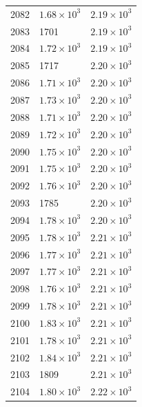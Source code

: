 \begin{table}[H]
\begin{tabular}{lll}
2082 & $\displaystyle 1.68 \times 10^{3}$ & $\displaystyle 2.19 \times 10^{3}$ \\
2083 & 1701 & $\displaystyle 2.19 \times 10^{3}$ \\
2084 & $\displaystyle 1.72 \times 10^{3}$ & $\displaystyle 2.19 \times 10^{3}$ \\
2085 & 1717 & $\displaystyle 2.20 \times 10^{3}$ \\
2086 & $\displaystyle 1.71 \times 10^{3}$ & $\displaystyle 2.20 \times 10^{3}$ \\
2087 & $\displaystyle 1.73 \times 10^{3}$ & $\displaystyle 2.20 \times 10^{3}$ \\
2088 & $\displaystyle 1.71 \times 10^{3}$ & $\displaystyle 2.20 \times 10^{3}$ \\
2089 & $\displaystyle 1.72 \times 10^{3}$ & $\displaystyle 2.20 \times 10^{3}$ \\
2090 & $\displaystyle 1.75 \times 10^{3}$ & $\displaystyle 2.20 \times 10^{3}$ \\
2091 & $\displaystyle 1.75 \times 10^{3}$ & $\displaystyle 2.20 \times 10^{3}$ \\
2092 & $\displaystyle 1.76 \times 10^{3}$ & $\displaystyle 2.20 \times 10^{3}$ \\
2093 & 1785 & $\displaystyle 2.20 \times 10^{3}$ \\
2094 & $\displaystyle 1.78 \times 10^{3}$ & $\displaystyle 2.20 \times 10^{3}$ \\
2095 & $\displaystyle 1.78 \times 10^{3}$ & $\displaystyle 2.21 \times 10^{3}$ \\
2096 & $\displaystyle 1.77 \times 10^{3}$ & $\displaystyle 2.21 \times 10^{3}$ \\
2097 & $\displaystyle 1.77 \times 10^{3}$ & $\displaystyle 2.21 \times 10^{3}$ \\
2098 & $\displaystyle 1.76 \times 10^{3}$ & $\displaystyle 2.21 \times 10^{3}$ \\
2099 & $\displaystyle 1.78 \times 10^{3}$ & $\displaystyle 2.21 \times 10^{3}$ \\
2100 & $\displaystyle 1.83 \times 10^{3}$ & $\displaystyle 2.21 \times 10^{3}$ \\
2101 & $\displaystyle 1.78 \times 10^{3}$ & $\displaystyle 2.21 \times 10^{3}$ \\
2102 & $\displaystyle 1.84 \times 10^{3}$ & $\displaystyle 2.21 \times 10^{3}$ \\
2103 & 1809 & $\displaystyle 2.21 \times 10^{3}$ \\
2104 & $\displaystyle 1.80 \times 10^{3}$ & $\displaystyle 2.22 \times 10^{3}$ \\

\end{tabular}
\end{table}
